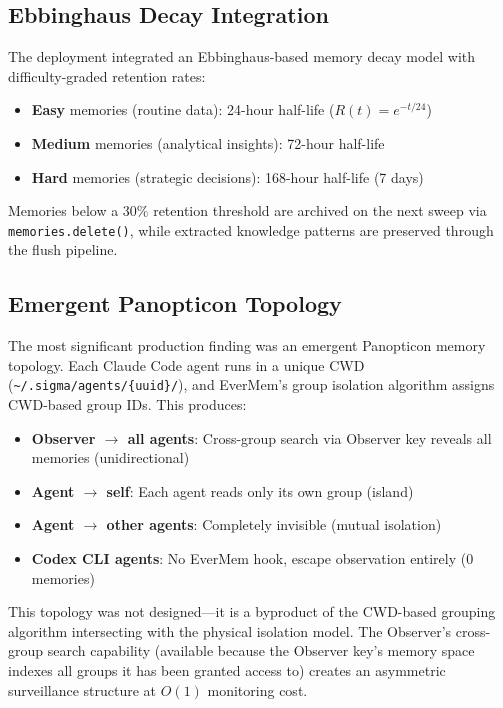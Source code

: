 \documentclass[11pt, a4paper]{article}
\begin{document}
\subsection{Ebbinghaus Decay Integration}

The deployment integrated an Ebbinghaus-based memory decay model with difficulty-graded retention rates:
\begin{itemize}[nosep]
  \item \textbf{Easy} memories (routine data): 24-hour half-life ($R(t) = e^{-t/24}$)
  \item \textbf{Medium} memories (analytical insights): 72-hour half-life
  \item \textbf{Hard} memories (strategic decisions): 168-hour half-life (7 days)
\end{itemize}

Memories below a 30\% retention threshold are archived on the next sweep via \texttt{memories.delete()}, while extracted knowledge patterns are preserved through the flush pipeline.

\subsection{Emergent Panopticon Topology}

The most significant production finding was an emergent Panopticon memory topology. Each Claude Code agent runs in a unique CWD (\texttt{\textasciitilde/.sigma/agents/\{uuid\}/}), and EverMem's group isolation algorithm assigns CWD-based group IDs. This produces:

\begin{itemize}[nosep]
  \item \textbf{Observer $\to$ all agents}: Cross-group search via Observer key reveals all memories (unidirectional)
  \item \textbf{Agent $\to$ self}: Each agent reads only its own group (island)
  \item \textbf{Agent $\to$ other agents}: Completely invisible (mutual isolation)
  \item \textbf{Codex CLI agents}: No EverMem hook, escape observation entirely (0 memories)
\end{itemize}

This topology was not designed---it is a byproduct of the CWD-based grouping algorithm intersecting with the physical isolation model. The Observer's cross-group search capability (available because the Observer key's memory space indexes all groups it has been granted access to) creates an asymmetric surveillance structure at $O(1)$ monitoring cost.
\end{document}
